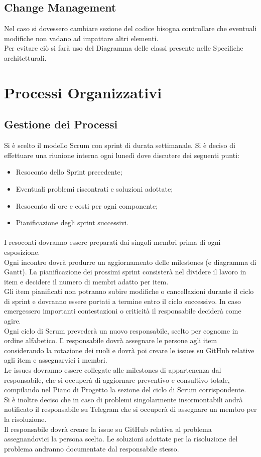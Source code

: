 \documentclass[a4paper, 12pt]{article}
\begin{document}
\subsection{Change Management}
Nel caso si dovessero cambiare sezione del codice bisogna controllare che eventuali modifiche
non vadano ad impattare altri elementi.\\
Per evitare ciò si farà uso del Diagramma delle classi presente nelle Specifiche architetturali.
\newpage
\section{Processi Organizzativi}
\subsection{Gestione dei Processi}
Si è scelto il modello Scrum con sprint di durata settimanale. Si è deciso di effettuare una riunione interna ogni lunedì dove discutere dei seguenti punti:
\begin{itemize}
    \item Resoconto dello Sprint precedente;
    \item Eventuali problemi riscontrati e soluzioni adottate;
    \item Resoconto di ore e costi per ogni componente;
    \item Pianificazione degli sprint successivi.
\end{itemize}
\paragraph{} I resoconti dovranno essere preparati dai singoli membri prima di ogni esposizione.\\ Ogni incontro dovrà produrre un aggiornamento delle milestones (e diagramma di Gantt). La pianificazione dei prossimi sprint consisterà nel dividere il lavoro in item e decidere il
numero di membri adatto per item. \\
\indent Gli item pianificati non potranno subire modifiche o cancellazioni durante il ciclo di sprint e dovranno essere portati a termine entro il ciclo successivo.
In caso emergessero importanti contestazioni o criticità il responsabile deciderà
come agire.\\
\indent Ogni ciclo di Scrum prevederà un nuovo responsabile, scelto per cognome in ordine alfabetico. Il responsabile dovrà assegnare le persone agli item considerando la
rotazione dei ruoli e dovrà poi creare le issues su GitHub relative agli item
e assegnarvici i membri. \\
\indent Le issues dovranno essere collegate alle milestones di appartenenza
dal responsabile, che si occuperà di aggiornare preventivo e consultivo
totale, compilando nel Piano di Progetto la sezione del ciclo di Scrum corrispondente. \\
\indent Si è inoltre deciso che in caso di problemi singolarmente insormontabili andrà notificato
il responsabile su Telegram che si occuperà di assegnare un membro per la risoluzione. \\
\indent Il responsabile dovrà creare la issue su GitHub relativa al problema assegnandovici la persona
scelta. Le soluzioni adottate per la risoluzione del problema andranno documentate
dal responsabile stesso.
\end{document}
